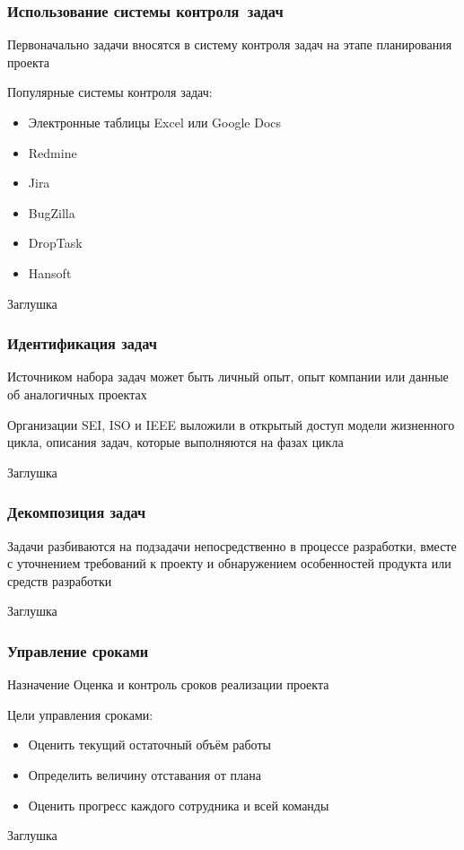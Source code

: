 \documentclass{../industrial-development}
\begin{document}
    \begin{frame} \frametitle{Использование системы контроля~задач}
        \begin{block}{}
            Первоначально задачи вносятся в систему контроля задач на этапе планирования проекта
        \end{block}
        Популярные системы контроля задач:
        \begin{itemize}
            \item Электронные таблицы Excel или Google Docs
            \item Redmine
            \item Jira
            \item BugZilla
            \item DropTask
            \item Hansoft
        \end{itemize}
    \end{frame}
    \lecturenotes
    Заглушка

    \begin{frame} \frametitle{Идентификация задач}
        \begin{block}{}
            Источником набора задач может быть личный опыт, опыт компании или данные об аналогичных проектах
        \end{block}
        \begin{block}{}
            Организации SEI, ISO и IEEE выложили в открытый доступ модели жизненного цикла, описания задач, которые выполняются на фазах цикла
        \end{block}
    \end{frame}
    \lecturenotes
    Заглушка
    
    \begin{frame} \frametitle{Декомпозиция задач}
        \begin{block}{}
            Задачи разбиваются на подзадачи непосредственно в процессе разработки, вместе с уточнением требований к проекту и обнаружением особенностей продукта или средств разработки
        \end{block}
    \end{frame}
    
    \lecturenotes
    Заглушка
    
    \begin{frame} \frametitle{Управление сроками}
        \begin{block}{Назначение}
            Оценка и контроль сроков реализации проекта
        \end{block}
        Цели управления сроками:
        \begin{itemize}
            \item Оценить текущий остаточный объём работы
            \item Определить величину отставания от плана
            \item Оценить прогресс каждого сотрудника и всей команды
        \end{itemize}
    \end{frame}
    \lecturenotes
    Заглушка
\end{document}
